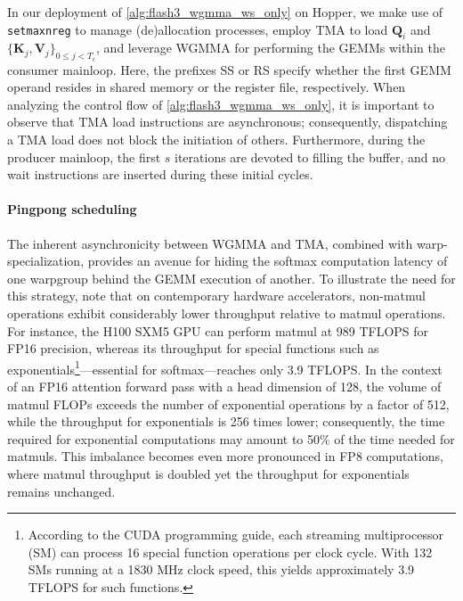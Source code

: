 \begin{enumerate}
In our deployment of \cref{alg:flash3_wgmma_ws_only} on Hopper, we make use of \verb|setmaxnreg| to manage (de)allocation processes, employ TMA to load $\mathbf{Q}_i$ and $\{ \mathbf{K}_j, \mathbf{V}_j \}_{0 \leq j < T_c}$, and leverage WGMMA for performing the GEMMs within the consumer mainloop. Here, the prefixes SS or RS specify whether the first GEMM operand resides in shared memory or the register file, respectively. When analyzing the control flow of \cref{alg:flash3_wgmma_ws_only}, it is important to observe that TMA load instructions are asynchronous; consequently, dispatching a TMA load does not block the initiation of others. Furthermore, during the producer mainloop, the first $s$ iterations are devoted to filling the buffer, and no wait instructions are inserted during these initial cycles.

\paragraph{Pingpong scheduling} The inherent asynchronicity between WGMMA and TMA, combined with warp-specialization, provides an avenue for hiding the softmax computation latency of one warpgroup behind the GEMM execution of another. To illustrate the need for this strategy, note that on contemporary hardware accelerators, non-matmul operations exhibit considerably lower throughput relative to matmul operations. For instance, the H100 SXM5 GPU can perform matmul at 989 TFLOPS for FP16 precision, whereas its throughput for special functions such as exponentials\footnote{According to the CUDA programming guide, each streaming multiprocessor (SM) can process 16 special function operations per clock cycle. With 132 SMs running at a 1830 MHz clock speed, this yields approximately 3.9 TFLOPS for such functions.}—essential for softmax—reaches only 3.9 TFLOPS. In the context of an FP16 attention forward pass with a head dimension of 128, the volume of matmul FLOPs exceeds the number of exponential operations by a factor of 512, while the throughput for exponentials is 256 times lower; consequently, the time required for exponential computations may amount to 50\% of the time needed for matmuls. This imbalance becomes even more pronounced in FP8 computations, where matmul throughput is doubled yet the throughput for exponentials remains unchanged.


\end{enumerate}
